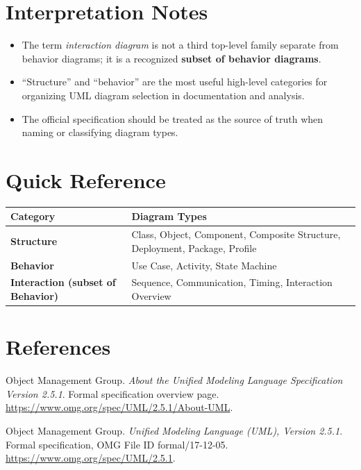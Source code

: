 \documentclass[11pt]{article}
\begin{document}
\section*{Interpretation Notes}
\begin{itemize}[leftmargin=1.5em]
  \item The term \textit{interaction diagram} is not a third top-level family separate from behavior diagrams; it is a recognized \textbf{subset of behavior diagrams}.\cite{omg-spec}
  \item ``Structure'' and ``behavior'' are the most useful high-level categories for organizing UML diagram selection in documentation and analysis.
  \item The official specification should be treated as the source of truth when naming or classifying diagram types.\cite{omg-about,omg-spec}
\end{itemize}

\section*{Quick Reference}
\begin{tabularx}{\textwidth}{@{}>{\raggedright\arraybackslash\bfseries}p{}Y@{}}
\toprule
Category & Diagram Types \\
\midrule
Structure & Class, Object, Component, Composite Structure, Deployment, Package, Profile \\
Behavior & Use Case, Activity, State Machine \\
Interaction (subset of Behavior) & Sequence, Communication, Timing, Interaction Overview \\
\bottomrule
\end{tabularx}

\section*{References}
\begin{thebibliography}{9}

Object Management Group.
\newblock \emph{About the Unified Modeling Language Specification Version 2.5.1}.
\newblock Formal specification overview page.
\newblock \url{https://www.omg.org/spec/UML/2.5.1/About-UML}.

Object Management Group.
\newblock \emph{Unified Modeling Language (UML), Version 2.5.1}.
\newblock Formal specification, OMG File ID formal/17-12-05.
\newblock \url{https://www.omg.org/spec/UML/2.5.1}.

\end{thebibliography}
\end{document}
